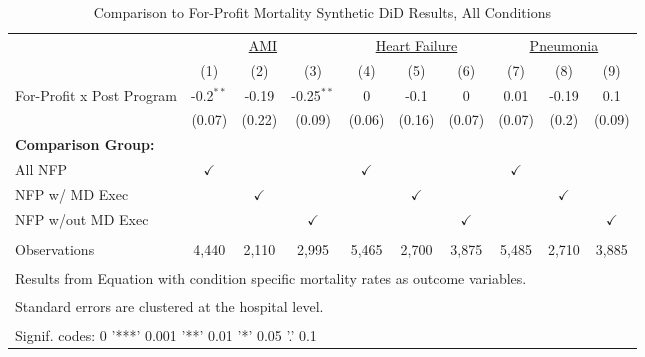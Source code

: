 \begin{table}[ht!]

\caption{\label{tab:fp_mort_condition_synth}Comparison to For-Profit Mortality Synthetic DiD Results, All Conditions}
\centering
\begin{tabular}[t]{lccccccccc}
\toprule
\multicolumn{1}{c}{\underline{ }} & \multicolumn{3}{c}{\underline{AMI}} & \multicolumn{3}{c}{\underline{Heart Failure}} & \multicolumn{3}{c}{\underline{Pneumonia}} \\
 & (1) & (2) & (3) & (4) & (5) & (6) & (7) & (8) & (9)\\
\midrule
For-Profit x Post Program & -0.2$^{**}$ & -0.19 & -0.25$^{**}$ & 0 & -0.1 & 0 & 0.01 & -0.19 & 0.1\\
 & (0.07) & (0.22) & (0.09) & (0.06) & (0.16) & (0.07) & (0.07) & (0.2) & (0.09)\\
\textbf{Comparison Group:} &  &  &  &  &  &  &  &  & \\
All NFP & $\checkmark$ &  &  & $\checkmark$ &  &  & $\checkmark$ &  & \\
NFP w/ MD Exec &  & $\checkmark$ &  &  & $\checkmark$ &  &  & $\checkmark$ & \\
\addlinespace
NFP w/out MD Exec &  &  & $\checkmark$ &  &  & $\checkmark$ &  &  & $\checkmark$\\
 &  &  &  &  &  &  &  &  & \\
Observations & 4,440 & 2,110 & 2,995 & 5,465 & 2,700 & 3,875 & 5,485 & 2,710 & 3,885\\
\bottomrule
\multicolumn{10}{l}{\textsuperscript{} Results from Equation with condition specific mortality rates as outcome variables.}\\
\multicolumn{10}{l}{\textsuperscript{} Standard errors are clustered at the hospital level.}\\
\multicolumn{10}{l}{\textsuperscript{} Signif. codes: 0 '***' 0.001 '**' 0.01 '*' 0.05 '.' 0.1}\\
\end{tabular}
\end{table}
